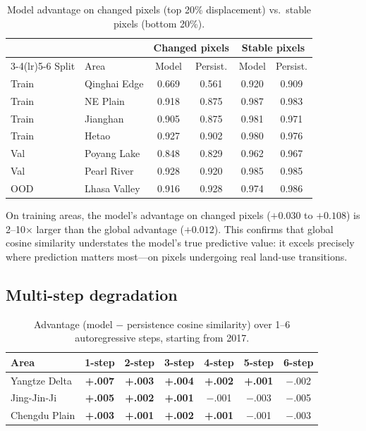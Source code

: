 \documentclass{article}
\begin{document}
\begin{table}[htbp]
\centering
\caption{Model advantage on changed pixels (top 20\% displacement) vs.\ stable pixels (bottom 20\%).}
\label{tab:changepixel}
\begin{tabular}{llcccc}
\toprule
 & & \multicolumn{2}{c}{Changed pixels} & \multicolumn{2}{c}{Stable pixels} \\
\cmidrule(lr){3-4}\cmidrule(lr){5-6}
Split & Area & Model & Persist. & Model & Persist. \\
\midrule
Train & Qinghai Edge & 0.669 & 0.561 & 0.920 & 0.909 \\
Train & NE Plain & 0.918 & 0.875 & 0.987 & 0.983 \\
Train & Jianghan & 0.905 & 0.875 & 0.981 & 0.971 \\
Train & Hetao & 0.927 & 0.902 & 0.980 & 0.976 \\
Val & Poyang Lake & 0.848 & 0.829 & 0.962 & 0.967 \\
Val & Pearl River & 0.928 & 0.920 & 0.985 & 0.985 \\
OOD & Lhasa Valley & 0.916 & 0.928 & 0.974 & 0.986 \\
\bottomrule
\end{tabular}
\end{table}

On training areas, the model's advantage on changed pixels ($+0.030$ to $+0.108$) is 2--10$\times$ larger than the global advantage ($+0.012$). This confirms that global cosine similarity understates the model's true predictive value: it excels precisely where prediction matters most---on pixels undergoing real land-use transitions.

\subsection{Multi-step degradation}

\begin{table}[htbp]
\centering
\caption{Advantage (model $-$ persistence cosine similarity) over 1--6 autoregressive steps, starting from 2017.}
\label{tab:multistep}
\begin{tabular}{lcccccc}
\toprule
Area & 1-step & 2-step & 3-step & 4-step & 5-step & 6-step \\
\midrule
Yangtze Delta & \textbf{+.007} & \textbf{+.003} & \textbf{+.004} & \textbf{+.002} & \textbf{+.001} & $-$.002 \\
Jing-Jin-Ji & \textbf{+.005} & \textbf{+.002} & \textbf{+.001} & $-$.001 & $-$.003 & $-$.005 \\
Chengdu Plain & \textbf{+.003} & \textbf{+.001} & \textbf{+.002} & \textbf{+.001} & $-$.001 & $-$.003 \\
\bottomrule
\end{tabular}
\end{table}
\end{document}
